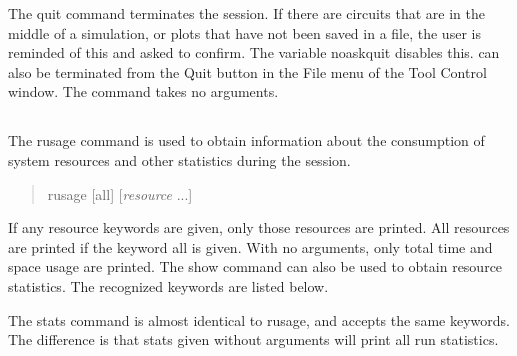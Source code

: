 
The {\cb quit} command terminates the {\WRspice} session.  If there
are circuits that are in the middle of a simulation, or plots that
have not been saved in a file, the user is reminded of this and
asked to confirm.  The variable {\et noaskquit} disables this. 
{\WRspice} can also be terminated from the {\cb Quit} button in the
{\cb File} menu of the {\cb Tool Control} window.  The command takes
no arguments.

\subsection{}


The {\cb rusage} command is used to obtain information about the
consumption of system resources and other statistics during the
{\WRspice} session.
\begin{quote}\vt
rusage [all] [{\it resource\/} ...]
\end{quote}
If any resource keywords are given, only those resources are printed. 
All resources are printed if the keyword {\vt all} is given.  With no
arguments, only total time and space usage are printed.  The {\cb
show} command can also be used to obtain resource statistics.  The
recognized keywords are listed below.

The {\cb stats} command is almost identical to {\cb rusage}, and
accepts the same keywords.  The difference is that {\cb stats} given
without arguments will print all run statistics.


